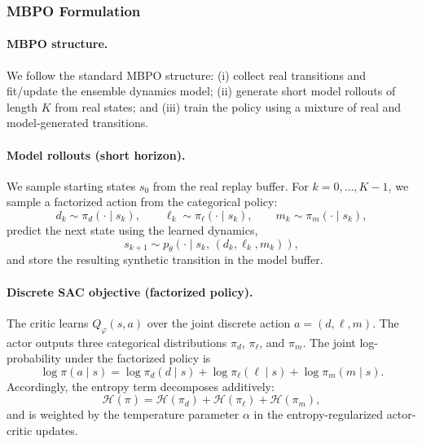 \documentclass[preprint,12pt]{elsarticle}
\begin{document}
\begin{frontmatter}
\subsubsection{MBPO Formulation}

\paragraph{MBPO structure.}
We follow the standard MBPO structure: (i) collect real transitions and fit/update the ensemble dynamics model; (ii) generate short model rollouts of length $K$ from real states; and (iii) train the policy using a mixture of real and model-generated transitions.

\paragraph{Model rollouts (short horizon).}
We sample starting states $s_0$ from the real replay buffer. For $k=0,\dots,K-1$, we sample a factorized action from the categorical policy:
\begin{equation}
d_k \sim \pi_d(\cdot \mid s_k), \qquad
\ell_k \sim \pi_\ell(\cdot \mid s_k), \qquad
m_k \sim \pi_m(\cdot \mid s_k),
\label{eq:mbpo_factorized_sampling}
\end{equation}
predict the next state using the learned dynamics,
\begin{equation}
s_{k+1} \sim p_{\theta}\!\left(\cdot \mid s_k,\,(d_k,\ell_k,m_k)\right),
\label{eq:mbpo_dynamics_rollout}
\end{equation}
and store the resulting synthetic transition in the model buffer.

\paragraph{Discrete SAC objective (factorized policy).}
The critic learns $Q_{\varphi}(s,a)$ over the joint discrete action $a=(d,\ell,m)$. The actor outputs three categorical distributions $\pi_d$, $\pi_\ell$, and $\pi_m$. The joint log-probability under the factorized policy is
\begin{equation}
\log \pi(a \mid s)=\log \pi_d(d \mid s)+\log \pi_\ell(\ell \mid s)+\log \pi_m(m \mid s).
\label{eq:mbpo_joint_logprob}
\end{equation}
Accordingly, the entropy term decomposes additively:
\begin{equation}
\mathcal{H}(\pi)=\mathcal{H}(\pi_d)+\mathcal{H}(\pi_\ell)+\mathcal{H}(\pi_m),
\label{eq:mbpo_entropy_decomp}
\end{equation}
and is weighted by the temperature parameter $\alpha$ in the entropy-regularized actor-critic updates.


\end{frontmatter}
\end{document}
